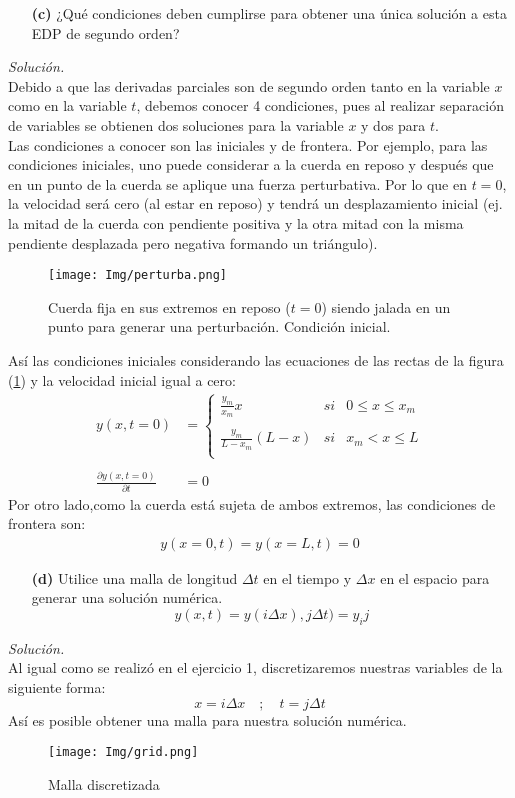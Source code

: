 \documentclass[11pt]{article}
\begin{document}
\begin{enumerate}
	\item [\textbf{(c)}] ¿Qué condiciones deben cumplirse para obtener una única solución
	a esta EDP de segundo orden? 
\end{enumerate}
\textit{Solución.}\\ Debido a que las derivadas parciales son de segundo orden tanto en la variable $x$ como en la variable $t$, debemos conocer 4 condiciones, pues al realizar separación de variables se obtienen dos soluciones para la variable $x$ y dos para $t$. \\
Las condiciones a conocer son las iniciales y de frontera. Por ejemplo, para las condiciones iniciales, uno puede considerar a la cuerda en reposo y después que en un punto de la cuerda se aplique una fuerza perturbativa. Por lo que en $t=0$, la velocidad será cero (al estar en reposo) y tendrá un desplazamiento inicial (ej. la mitad de la cuerda con pendiente positiva y la otra mitad con la misma pendiente desplazada pero negativa formando un triángulo). 
\begin{figure}[h]
	\centering
	\texttt{[image: Img/perturba.png]}
	\caption{\centering Cuerda fija en sus extremos en reposo ($t=0$) siendo jalada en un punto para generar una perturbación. Condición inicial.}
	\label{ex}
\end{figure}

	Así las condiciones iniciales considerando las ecuaciones de las rectas de la figura  (\ref{ex}) y la velocidad inicial igual a cero:
\begin{align*}
		y(x, t=0)&= \left\{\begin{array}{lcc}
								\frac{y_m}{x_m} x &   si  & 0\leq x \leq x_m \\\\
					 			\frac{y_m}{L-x_m} (L-x) &  si &  x_m<x \leq  L \\
							\end{array}\right. \\\\
		\frac{\partial y(x, t=0)}{\partial t} &=0
\end{align*}
Por otro lado,como la cuerda está sujeta de ambos extremos, las condiciones de frontera son:
\begin{align*}
	y(x=0, t) = y(x=L,t) = 0
\end{align*}

\begin{enumerate}
	\item [\textbf{(d)}] Utilice una malla de longitud $\Delta t$ en el tiempo y $\Delta x$ en el espacio para generar una solución numérica.
	$$y(x,t) = y(i\Delta x), j\Delta t)=y_ij$$
\end{enumerate}
\textit{Solución.}\\
	Al igual como se realizó en el ejercicio 1, discretizaremos nuestras variables de la siguiente forma:
	$$x = i\Delta x\quad;\quad t= j \Delta t$$
	Así es posible obtener una malla para nuestra solución numérica.
	\begin{figure}[h]
		\centering
		\texttt{[image: Img/grid.png]}
		\caption{Malla discretizada}
		\label{grid}
	\end{figure}
	
\end{document}
